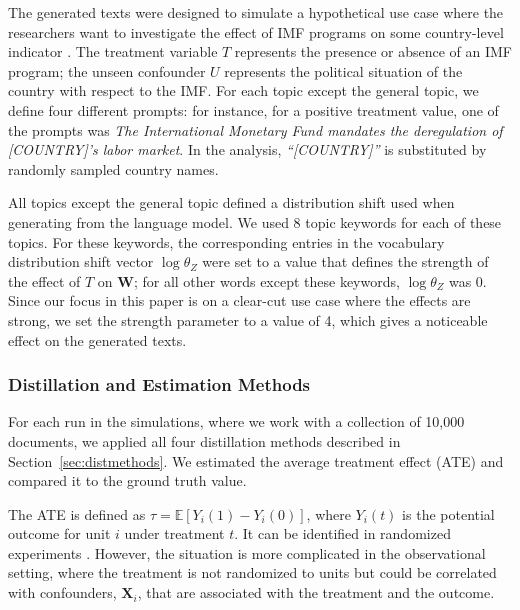 \documentclass[11pt]{article}
\newcommand{\bX}{\bm{X}} %
\newcommand{\bW}{\bm{W}}  %
\begin{document}
The generated texts were designed to simulate a hypothetical use case where the researchers want to investigate the effect of IMF programs on some country-level indicator \citep[cf.][]{daoud2019international}. The treatment variable $T$ represents the presence or absence of an IMF program; the unseen confounder $U$ represents the political situation of the country with respect to the IMF.
For each topic except the general topic, we define four different prompts: for instance, for a positive treatment value, one of the prompts was \emph{The International Monetary Fund mandates the deregulation of [COUNTRY]'s labor market}. In the analysis, \emph{``[COUNTRY]''} is substituted by randomly sampled country names.

All topics except the general topic defined a distribution shift used when generating from the language model. We used 8 topic keywords for each of these topics. For these keywords, the corresponding entries in the vocabulary distribution shift vector $\log \theta_Z$ were set to a value that defines the strength of the effect of $T$ on $\bW$; for all other words except these keywords, $\log \theta_Z$ was 0.
Since our focus in this paper is on a clear-cut use case where the effects are strong, we set the strength parameter to a value of 4, which gives a noticeable effect on the generated texts.


\subsubsection{Distillation and Estimation Methods}

For each run in the simulations, where we work with a collection of 10,000 documents, we applied all four distillation methods described in Section~\ref{sec:distmethods}. We estimated the average treatment effect (ATE) and compared it to the ground truth value.

The ATE is defined as $\tau = \mathbb{E}[Y_i(1) - Y_i(0)]$, where $Y_i(t)$ is the potential outcome for unit $i$ under treatment $t$. It can be identified in randomized experiments \cite{Rubin1974}. However, the situation is  more complicated in the observational setting, where the treatment is not randomized to units but could be correlated with confounders, $\bX_i$, that are associated with the treatment and the outcome.
\end{document}
